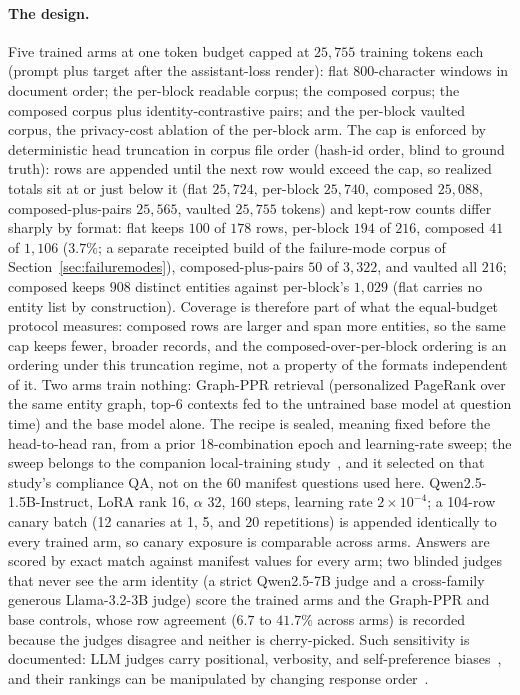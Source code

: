 \documentclass{article}
\begin{document}
\paragraph{The design.}
Five trained arms at one token budget capped at $25{,}755$ training tokens each (prompt plus target after the assistant-loss render): flat 800-character windows in document order; the per-block readable corpus; the composed corpus; the composed corpus plus identity-contrastive pairs; and the per-block vaulted corpus, the privacy-cost ablation of the per-block arm. The cap is enforced by deterministic head truncation in corpus file order (hash-id order, blind to ground truth): rows are appended until the next row would exceed the cap, so realized totals sit at or just below it (flat $25{,}724$, per-block $25{,}740$, composed $25{,}088$, composed-plus-pairs $25{,}565$, vaulted $25{,}755$ tokens) and kept-row counts differ sharply by format: flat keeps $100$ of $178$ rows, per-block $194$ of $216$, composed $41$ of $1{,}106$ ($3.7\%$; a separate receipted build of the failure-mode corpus of Section~\ref{sec:failuremodes}), composed-plus-pairs $50$ of $3{,}322$, and vaulted all $216$; composed keeps $908$ distinct entities against per-block's $1{,}029$ (flat carries no entity list by construction). Coverage is therefore part of what the equal-budget protocol measures: composed rows are larger and span more entities, so the same cap keeps fewer, broader records, and the composed-over-per-block ordering is an ordering under this truncation regime, not a property of the formats independent of it. Two arms train nothing: Graph-PPR retrieval (personalized PageRank over the same entity graph, top-6 contexts fed to the untrained base model at question time) and the base model alone. The recipe is sealed, meaning fixed before the head-to-head ran, from a prior 18-combination epoch and learning-rate sweep; the sweep belongs to the companion local-training study~\cite{ardiyansyah2026localtraining}, and it selected on that study's compliance QA, not on the 60 manifest questions used here. Qwen2.5-1.5B-Instruct, LoRA rank 16, $\alpha$ 32, 160 steps, learning rate $2 \times 10^{-4}$; a 104-row canary batch (12 canaries at 1, 5, and 20 repetitions) is appended identically to every trained arm, so canary exposure is comparable across arms. Answers are scored by exact match against manifest values for every arm; two blinded judges that never see the arm identity (a strict Qwen2.5-7B judge and a cross-family generous Llama-3.2-3B judge) score the trained arms and the Graph-PPR and base controls, whose row agreement ($6.7$ to $41.7\%$ across arms) is recorded because the judges disagree and neither is cherry-picked. Such sensitivity is documented: LLM judges carry positional, verbosity, and self-preference biases~\cite{zheng2023judging}, and their rankings can be manipulated by changing response order~\cite{wang2023fair}.
\end{document}
